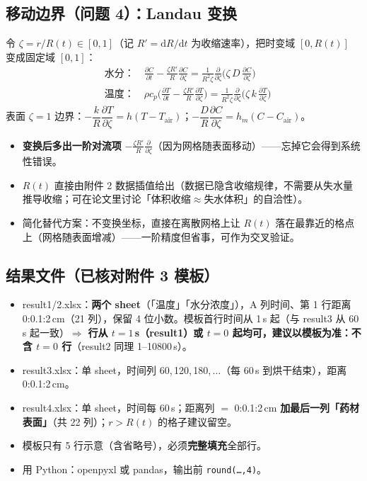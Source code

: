 \documentclass[12pt,a4paper]{ctexart}
\begin{document}
\subsection{移动边界（问题 4）：Landau 变换}
令 $\zeta=r/R(t)\in[0,1]$（记 $R'=\mathrm{d}R/\mathrm{d}t$ 为收缩速率），把时变域 $[0,R(t)]$ 变成固定域 $[0,1]$：
\begin{align}
&\text{水分：}\quad \frac{\partial C}{\partial t}-\frac{\zeta R'}{R}\frac{\partial C}{\partial\zeta}
=\frac{1}{R^2\zeta}\frac{\partial}{\partial\zeta}\Big(\zeta\,D\,\frac{\partial C}{\partial\zeta}\Big)\\[4pt]
&\text{温度：}\quad \rho c_p\Big(\frac{\partial T}{\partial t}-\frac{\zeta R'}{R}\frac{\partial T}{\partial\zeta}\Big)
=\frac{1}{R^2\zeta}\frac{\partial}{\partial\zeta}\Big(\zeta\,k\,\frac{\partial T}{\partial\zeta}\Big)
\end{align}
表面 $\zeta=1$ 边界：$-\dfrac{k}{R}\dfrac{\partial T}{\partial\zeta}=h(T-T_{\mathrm{air}})$；$-\dfrac{D}{R}\dfrac{\partial C}{\partial\zeta}=h_m(C-C_{\mathrm{air}})$。

\begin{itemize}
\item \textbf{变换后多出一阶对流项} $-\frac{\zeta R'}{R}\frac{\partial}{\partial\zeta}$（因为网格随表面移动）——忘掉它会得到系统性错误。
\item $R(t)$ 直接由附件 2 数据插值给出（数据已隐含收缩规律，不需要从失水量推导收缩；可在论文里讨论「体积收缩$\approx$失水体积」的自洽性）。
\item 简化替代方案：不变换坐标，直接在离散网格上让 $R(t)$ 落在最靠近的格点上（网格随表面增减）——一阶精度但省事，可作为交叉验证。
\end{itemize}

\subsection{结果文件（已核对附件 3 模板）}
\begin{itemize}
\item result1/2.xlsx：\textbf{两个 sheet}（「温度」「水分浓度」），A 列时间、第 1 行距离 0:0.1:2\,cm（21 列），保留 4 位小数。模板首行时间从 1\,s 起（与 result3 从 60\,s 起一致）$\Rightarrow$ \textbf{行从 $t=1$\,s（result1）或 $t=0$ 起均可，建议以模板为准：不含 $t=0$ 行}（result2 同理 1--10800\,s）。
\item result3.xlsx：单 sheet，时间列 60,\,120,\,180,\,$\ldots$（每 60\,s 到烘干结束），距离 0:0.1:2\,cm。
\item result4.xlsx：单 sheet，时间每 60\,s；距离列 $=$ 0:0.1:2\,cm \textbf{加最后一列「药材表面」}（共 22 列）；$r>R(t)$ 的格子建议留空。
\item 模板只有 5 行示意（含省略号），必须\textbf{完整填充}全部行。
\item 用 Python：openpyxl 或 pandas，输出前 \texttt{round(\dots,4)}。
\end{itemize}
\end{document}
